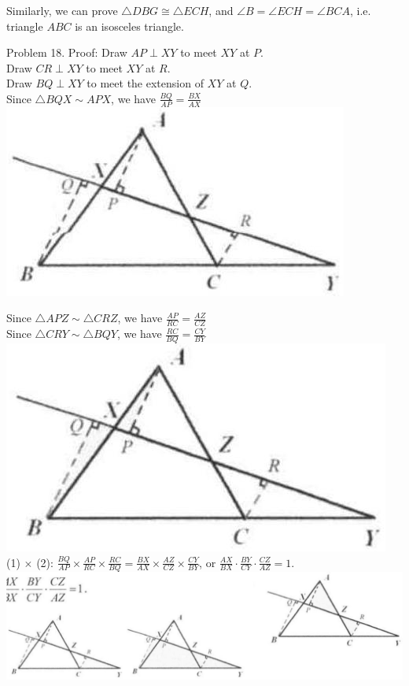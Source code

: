 \documentclass[10pt]{article}
\begin{document}
Similarly, we can prove \(\triangle D B G \cong \triangle E C H\), and \(\angle B=\angle E C H=\angle B C A\), i.e. triangle \(A B C\) is an isosceles triangle.

Problem 18. Proof:
Draw \(A P \perp X Y\) to meet \(X Y\) at \(P\).\\
Draw \(C R \perp X Y\) to meet \(X Y\) at \(R\).\\
Draw \(B Q \perp X Y\) to meet the extension of \(X Y\) at \(Q\).\\
Since \(\triangle B Q X \sim A P X\), we have \(\frac{B Q}{A P}=\frac{B X}{A X}\)\\
\includegraphics[max width=\textwidth, center]{2025_04_17_97bc1f7e44d93c271a88g-099(1)}

Since \(\triangle A P Z \sim \triangle C R Z\), we have \(\frac{A P}{R C}=\frac{A Z}{C Z}\)\\
Since \(\triangle C R Y \sim \triangle B Q Y\), we have \(\frac{R C}{B Q}=\frac{C Y}{B Y}\)\\
\includegraphics[max width=\textwidth, center]{2025_04_17_97bc1f7e44d93c271a88g-099}\\
(1) \(\times\) (2): \(\frac{B Q}{A P} \times \frac{A P}{R C} \times \frac{R C}{B Q}=\frac{B X}{A X} \times \frac{A Z}{C Z} \times \frac{C Y}{B Y}\), or \(\frac{A X}{B X} \cdot \frac{B Y}{C Y} \cdot \frac{C Z}{A Z}=1\).\\
\includegraphics[max width=\textwidth, center]{2025_04_17_97bc1f7e44d93c271a88g-099(2)}
\end{document}
